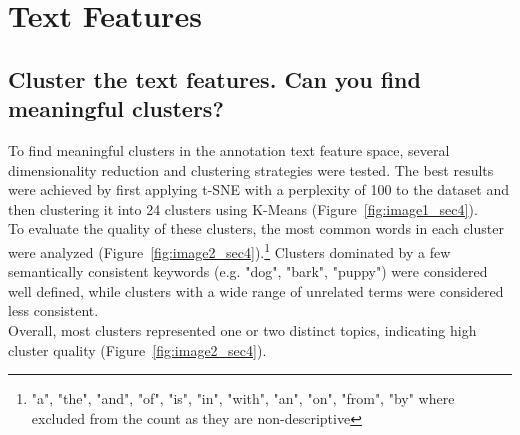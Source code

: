 
\section{Text Features}
\label{sec:Text Features}

\subsection{Cluster the text features. Can you find meaningful clusters?}
To find meaningful clusters in the annotation text feature space, several dimensionality reduction and clustering strategies were tested. The best results were achieved by first applying t-SNE with a perplexity of 100 to the dataset and then clustering it into 24 clusters using K-Means (Figure~\ref{fig:image1_sec4}). \\
To evaluate the quality of these clusters, the most common words in each cluster were analyzed (Figure~\ref{fig:image2_sec4}).\footnote{"a", "the", "and", "of", "is", "in", "with", "an", "on", "from", "by" where excluded from the count as they are non-descriptive} Clusters dominated by a few semantically consistent keywords (e.g. "dog", "bark", "puppy") were considered well defined, while clusters with a wide range of unrelated terms were considered less consistent. \\
Overall, most clusters represented one or two distinct topics, indicating high cluster quality (Figure~\ref{fig:image2_sec4}).

